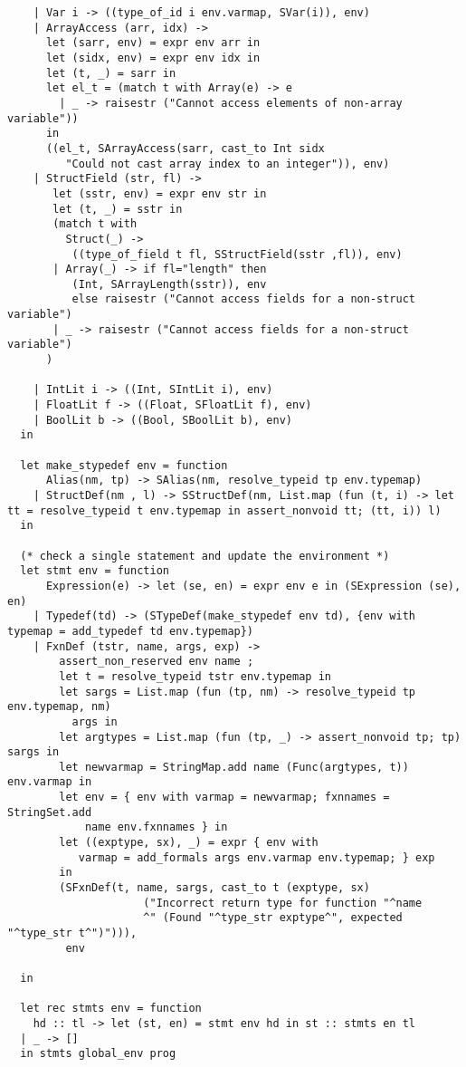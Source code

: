 \documentclass[main.tex]{subfiles}
\begin{document}
\begin{lstlisting}
    | Var i -> ((type_of_id i env.varmap, SVar(i)), env)
    | ArrayAccess (arr, idx) -> 
      let (sarr, env) = expr env arr in
      let (sidx, env) = expr env idx in
      let (t, _) = sarr in
      let el_t = (match t with Array(e) -> e
        | _ -> raisestr ("Cannot access elements of non-array variable"))
      in
      ((el_t, SArrayAccess(sarr, cast_to Int sidx
         "Could not cast array index to an integer")), env)
    | StructField (str, fl) -> 
       let (sstr, env) = expr env str in
       let (t, _) = sstr in
       (match t with
         Struct(_) ->
          ((type_of_field t fl, SStructField(sstr ,fl)), env)
       | Array(_) -> if fl="length" then
          (Int, SArrayLength(sstr)), env
          else raisestr ("Cannot access fields for a non-struct variable")
       | _ -> raisestr ("Cannot access fields for a non-struct variable")
      )

    | IntLit i -> ((Int, SIntLit i), env)
    | FloatLit f -> ((Float, SFloatLit f), env)
    | BoolLit b -> ((Bool, SBoolLit b), env)
  in

  let make_stypedef env = function
      Alias(nm, tp) -> SAlias(nm, resolve_typeid tp env.typemap)
    | StructDef(nm , l) -> SStructDef(nm, List.map (fun (t, i) -> let tt = resolve_typeid t env.typemap in assert_nonvoid tt; (tt, i)) l)
  in

  (* check a single statement and update the environment *)
  let stmt env = function
      Expression(e) -> let (se, en) = expr env e in (SExpression (se), en)
    | Typedef(td) -> (STypeDef(make_stypedef env td), {env with typemap = add_typedef td env.typemap})
    | FxnDef (tstr, name, args, exp) ->
        assert_non_reserved env name ;
        let t = resolve_typeid tstr env.typemap in
        let sargs = List.map (fun (tp, nm) -> resolve_typeid tp env.typemap, nm)
          args in
        let argtypes = List.map (fun (tp, _) -> assert_nonvoid tp; tp) sargs in
        let newvarmap = StringMap.add name (Func(argtypes, t)) env.varmap in
        let env = { env with varmap = newvarmap; fxnnames = StringSet.add
            name env.fxnnames } in
        let ((exptype, sx), _) = expr { env with
           varmap = add_formals args env.varmap env.typemap; } exp
        in
        (SFxnDef(t, name, sargs, cast_to t (exptype, sx)
                     ("Incorrect return type for function "^name
                     ^" (Found "^type_str exptype^", expected "^type_str t^")"))),
         env

  in

  let rec stmts env = function 
    hd :: tl -> let (st, en) = stmt env hd in st :: stmts en tl
  | _ -> []
  in stmts global_env prog
\end{lstlisting}
\end{document}

